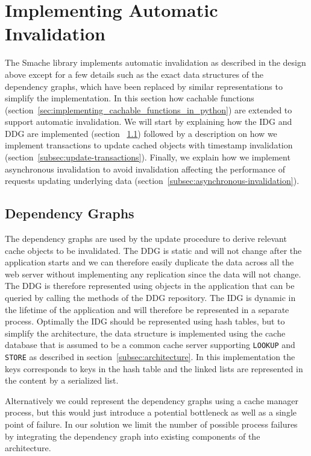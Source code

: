 
\section{Implementing Automatic Invalidation}
\label{sec:implementing-automatic-invalidation}

The Smache library implements automatic invalidation as described in the design above except for a few details such as the exact data structures of the dependency graphs, which have been replaced by similar representations to simplify the implementation. In this section how cachable functions (section~\ref{sec:implementing_cachable_functions_in_python}) are extended to support automatic invalidation. We will start by explaining how the IDG and DDG are implemented (section ~\ref{subsec:dependency-graphs}) followed by a description on how we implement transactions to update cached objects with timestamp invalidation (section~\ref{subsec:update-transactions}). Finally, we explain how we implement asynchronous invalidation to avoid invalidation affecting the performance of requests updating underlying data (section~\ref{subsec:asynchronous-invalidation}).

\subsection{Dependency Graphs}
\label{subsec:dependency-graphs}

The dependency graphs are used by the update procedure to derive relevant cache objects to be invalidated.
The DDG is static and will not change after the application starts and we can therefore easily duplicate the data across all the web server without implementing any replication since the data will not change. The DDG is therefore represented using objects in the application that can be queried by calling the methods of the DDG repository.
The IDG is dynamic in the lifetime of the application and will therefore be represented in a separate process. Optimally the IDG should be represented using hash tables, but to simplify the architecture, the data structure is implemented using the cache database that is assumed to be a common cache server supporting \verb$LOOKUP$ and \verb$STORE$ as described in section~\ref{subsec:architecture}. In this implementation the keys corresponds to keys in the hash table and the linked lists are represented in the content by a serialized list.

Alternatively we could represent the dependency graphs using a cache manager process, but this would just introduce a potential bottleneck as well as a single point of failure. In our solution we limit the number of possible process failures by integrating the dependency graph into existing components of the architecture.

